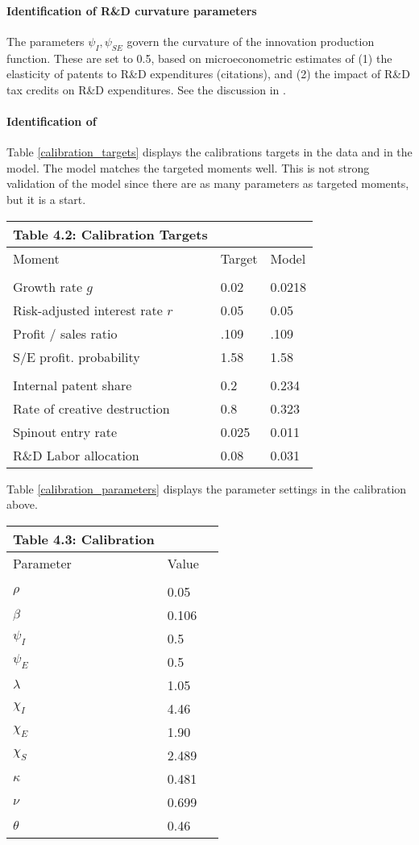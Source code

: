 \documentclass[12pt,english]{article}
\theoremstyle{remark}
\begin{document}
\paragraph{Identification of R\&D curvature parameters}

The parameters $\psi_I, \psi_{SE}$ govern the curvature of the innovation production function. These are set to 0.5, based on microeconometric estimates of (1) the elasticity of patents to R\&D expenditures (citations), and (2) the impact of R\&D tax credits on R\&D expenditures. See the discussion in \cite{akcigit_growth_2018}.

\paragraph{Identification of }

Table \ref{calibration_targets} displays the calibrations targets in the data and in the model. The model matches the targeted moments well. This is not strong validation of the model since there are as many parameters as targeted moments, but it is a start. 


\begin{center}
	\begin{tabular}{lll}
		Table 4.2: Calibration Targets &  &  \tabularnewline
		\hline 
		Moment  & Target & Model \tabularnewline
		& \tabularnewline
		\hline 
		Growth rate $g$ & 0.02 & 0.0218 \tabularnewline
		Risk-adjusted interest rate $r$ & 0.05 & 0.05 \tabularnewline
		Profit / sales ratio & .109 & .109 \tabularnewline
		S/E profit. probability & 1.58 & 1.58 \tabularnewline
		\tabularnewline
		Internal patent share & 0.2 & 0.234
		\tabularnewline
		Rate of creative destruction & 0.8 & 0.323
		\tabularnewline
		Spinout entry rate & 0.025 & 0.011
		\tabularnewline
		R\&D Labor allocation & 0.08 & 0.031
	\end{tabular}
	\label{calibration_targets}
\end{center}

Table \ref{calibration_parameters} displays the parameter settings in the calibration above. 

\begin{table*}[h]\label{calibration_parameters}
	\centering
	\begin{tabular}{lll}
	Table 4.3: Calibration &   \tabularnewline
	\hline 
	Parameter & Value\tabularnewline
	\tabularnewline
	\hline 
	$\rho$ & 0.05\tabularnewline
	$\beta$ & 0.106\tabularnewline
	$\psi_I$ & 0.5\tabularnewline
	$\psi_E$ & 0.5\tabularnewline
	$\lambda$ & 1.05\tabularnewline
	$\chi_I$ & 4.46 \tabularnewline
	$\chi_E$ & 1.90 \tabularnewline
	$\chi_S$ & 2.489 \tabularnewline
	$\kappa$ & 0.481 \tabularnewline
	$\nu$ & 0.699 \tabularnewline
	$\theta$ & 0.46
	\end{tabular}
\end{table*}
\end{document}
